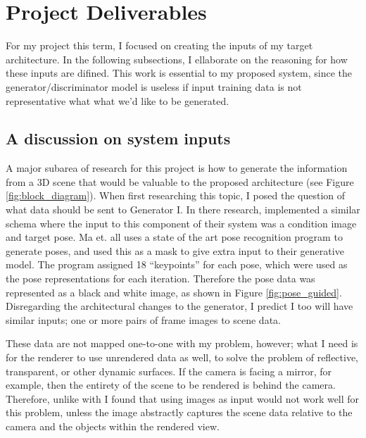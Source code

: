 \documentclass[conference]{IEEEtran}
\begin{document}
\section{Project Deliverables}
\label{sec:deliverables}
For my project this term, I focused on creating the inputs of my target
architecture. In the following subsections, I ellaborate
on the reasoning for how these inputs are difined. This work is essential to my
proposed system, since the generator/discriminator model is useless if input
training data is not representative what what we'd like to be generated.

\subsection{A discussion on system inputs}
\label{subsec:inputs}
A major subarea of research for this project is how to generate the
information from a 3D scene that would be valuable to the proposed architecture
(see Figure \ref{fig:block_diagram}).
When first researching this topic, I posed the question of what
data should be sent to Generator I.
In there research, \cite{ref:pose_guided} implemented a similar schema where the input to this
component of their system was a condition image and target pose.
Ma et. all uses a state of the art pose recognition program to
generate poses, and used this as a mask to give extra input to their generative model.
The program assigned 18 ``keypoints'' for each pose,
which were used as the pose representations for each iteration.
Therefore the pose data was represented as a black and white image,
as shown in Figure \ref{fig:pose_guided}.
Disregarding the architectural changes to the generator, I predict I too will
have similar inputs; one or more pairs of frame images to scene data.

These data are not mapped one-to-one with my problem, however;
what I need is for the renderer to use unrendered data as well,
to solve the problem of reflective, transparent, or other dynamic surfaces.
If the camera is facing a mirror, for example,
then the entirety of the scene to be rendered is behind the camera.
Therefore, unlike with \cite{ref:pose_guided}
I found that using images as input would not work well for this problem,
unless the image abstractly captures the scene data relative to the camera and
the objects within the rendered view.
\end{document}
